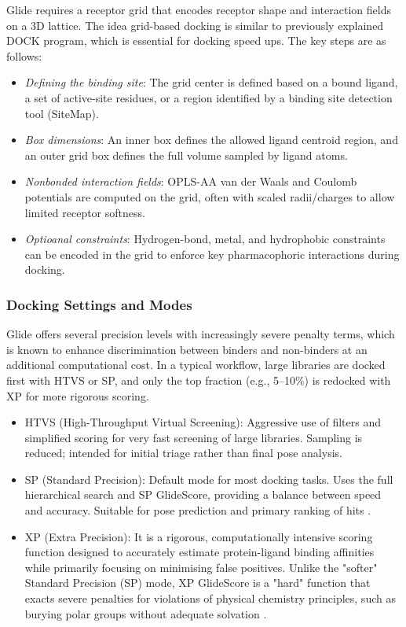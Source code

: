\documentclass[12pt, a4paper]{article}
\begin{document}
Glide requires a receptor grid that encodes receptor shape and interaction fields on a 3D lattice. The idea grid-based docking is similar to previously explained DOCK program, which is essential for docking speed ups.
The key steps are as follows:
\begin{itemize}
  \item \textit{Defining the binding site}: The grid center is defined based on a bound ligand, a set of active-site residues, or a region identified by a binding site detection tool (SiteMap\cite{CH7_sitemap}).
  \item \textit{Box dimensions}: An inner box defines the allowed ligand centroid region, and an outer grid box defines the full volume sampled by ligand atoms.
  \item \textit{Nonbonded interaction fields}: OPLS-AA van der Waals and Coulomb potentials are computed on the grid, often with scaled radii/charges to allow limited receptor softness.
  \item \textit{Optioanal constraints}: Hydrogen-bond, metal, and hydrophobic constraints can be encoded in the grid to enforce key pharmacophoric interactions during docking.
\end{itemize}

\subsubsection{Docking Settings and Modes}

Glide offers several precision levels with increasingly severe penalty terms, which is known to enhance discrimination between binders and non-binders at an additional computational cost. In a typical workflow, large libraries are docked first with HTVS or SP, and only the top fraction (e.g., 5--10\%) is redocked with XP for more rigorous scoring.

\begin{itemize}
  \item HTVS (High-Throughput Virtual Screening): Aggressive use of filters and simplified scoring for very fast screening of large libraries. Sampling is reduced; intended for initial triage rather than final pose analysis.
  \item SP (Standard Precision): Default mode for most docking tasks. Uses the full hierarchical search and SP GlideScore, providing a balance between speed and accuracy. Suitable for pose prediction and primary ranking of hits \cite{CH7_Friesner2004a,CH7_Friesner2004b}.
  \item XP (Extra Precision): It is a rigorous, computationally intensive scoring function designed to accurately estimate protein-ligand binding affinities while primarily focusing on minimising false positives. Unlike the "softer" Standard Precision (SP) mode, XP GlideScore is a "hard" function that exacts severe penalties for violations of physical chemistry principles, such as burying polar groups without adequate solvation \cite{CH7_Friesner2006}.
\end{itemize}
\end{document}
